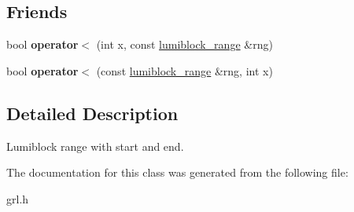 \subsection*{Friends}
\begin{DoxyCompactItemize}
\item 
\mbox{\label{classgrl_1_1lumiblock__range_af72873533bc450b68c1f0f3b235ec700}} 
bool {\bfseries operator$<$} (int x, const \mbox{\hyperlink{classgrl_1_1lumiblock__range}{lumiblock\+\_\+range}} \&rng)
\item 
\mbox{\label{classgrl_1_1lumiblock__range_a3b47a8d4d7e8d3e7986a12bf7cd6c739}} 
bool {\bfseries operator$<$} (const \mbox{\hyperlink{classgrl_1_1lumiblock__range}{lumiblock\+\_\+range}} \&rng, int x)
\end{DoxyCompactItemize}


\subsection{Detailed Description}
Lumiblock range with start and end. 

The documentation for this class was generated from the following file\+:\begin{DoxyCompactItemize}
\item 
grl.\+h\end{DoxyCompactItemize}
